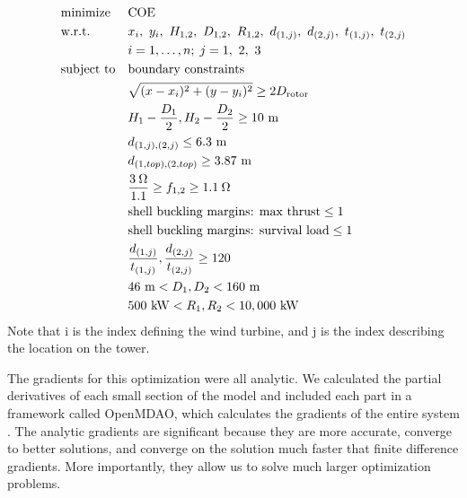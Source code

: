         
        \begin{equation}
			\begin{aligned}
				& \text{minimize}
					& & \text{COE} \\
                & \text{w.r.t.} 
                	&& x_i,~ y_i,~ H_{1,2},~ D_{1,2},~ R_{1,2},~ d_{(1,j)},~ d_{(2,j)},~ t_{(1,j)},~t_{(2,j)}\\
                		&&& i = 1, \ldots, n; \; j = 1,~2,~3 \\
				& \text{subject to}
					& & \text{boundary constraints} \\
						&&& \sqrt{(x-x_i)^2+(y-y_i)^2} \geq 2D_{\text{rotor}} \\
						&&& H_1-\frac{D_1}{2}, H_2-\frac{D_2}{2} \geq 10~ \text{m}\\
                		&&& d_{(1,j),(2,j)} \leq 6.3~ \text{m}\\
                		&&& d_{(1,top),(2,top)} \geq 3.87~ \text{m}\\
						&&& \frac{3\hspace{0.08cm}\Omega}{1.1} \geq f_{1,2} \geq 1.1\hspace{0.08cm}\Omega \\
                		&&& \text{shell buckling margins: max thrust} \leq 1 \\
                        &&& \text{shell buckling margins: survival load} \leq 1 \\
                		&&& \frac{d_{(1,j)}}{t_{(1,j)}},\frac{d_{(2,j)}}{t_{(2,j)}} \geq 120\\
                        &&& 46~ \text{m} < D_1,D_2 < 160~ \text{m}  \\
                        &&& 500~ \text{kW} < R_1,R_2 < 10,000~ \text{kW} \\
			\end{aligned}
		\end{equation}
%
Note that i is the index defining the wind turbine, and j is the index describing the location on the tower.
        
        The gradients for this optimization were all analytic. We calculated the partial derivatives of each small section of the model and included each part in a framework called OpenMDAO, which calculates the gradients of the entire system \citep{gray2010openmdao}. The analytic gradients are significant because they are more accurate, converge to better solutions, and converge on the solution much faster that finite difference gradients. More importantly, they allow us to solve much larger optimization problems. 
        
